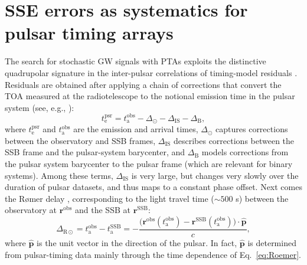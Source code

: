 \documentclass{aastex63}
\begin{document}
\section{SSE errors as systematics for pulsar timing arrays}
\label{sec:systematics}

The search for stochastic GW signals with PTAs exploits the distinctive quadrupolar signature in the inter-pulsar correlations of timing-model residuals \citep{hd83}.
Residuals are obtained after applying a chain of corrections that convert the TOA measured at the radiotelescope to the notional emission time in the pulsar system (see, e.g., \citealt{ehm06}):
%
\begin{equation}
    t_\mathrm{e}^\mathrm{psr} = t_\mathrm{a}^\mathrm{obs} - \Delta_\odot - \Delta_\mathrm{IS} - \Delta_\mathrm{B},
\end{equation}
%
where $t_\mathrm{e}^\mathrm{psr}$ and $t_\mathrm{a}^\mathrm{obs}$ are the emission and arrival times, $\Delta_\odot$ captures corrections between the observatory and SSB frames, $\Delta_\mathrm{IS}$ describes corrections between the SSB frame and the pulsar-system barycenter, and $\Delta_\mathrm{B}$ models corrections from the pulsar system barycenter to the pulsar frame (which are relevant for binary systems).
Among these terms, $\Delta_\mathrm{IS}$ is very large, but changes very slowly over the duration of pulsar datasets, and thus maps to a constant phase offset. Next comes the R{\o}mer delay \citep{Roemer1676}, corresponding to the light travel time ($\sim 500$ s) between the observatory at $\mathbf{r}^\mathrm{obs}$ and the SSB at $\mathbf{r}^\mathrm{SSB}$:
%
\begin{equation}
\label{eq:Roemer}
\Delta_{\mathrm{R}\odot} =
t_\mathrm{a}^\mathrm{obs} - t_\mathrm{a}^\mathrm{SSB} =
-\frac{\bigl(\mathbf{r}^\mathrm{obs}(t_\mathrm{a}^\mathrm{obs}) - \mathbf{r}^\mathrm{SSB}(t_\mathrm{a}^\mathrm{obs})\bigr) \cdot \hat{\mathbf{p}}}{c},
\end{equation}
%
where $\hat{\mathbf{p}}$ is the unit vector in the direction of the pulsar. In fact, $\hat{\mathbf{p}}$ is determined from pulsar-timing data mainly through the time dependence of Eq.\ \eqref{eq:Roemer}. 
\end{document}
